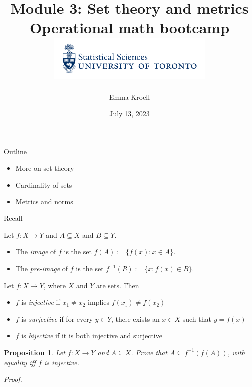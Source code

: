 \documentclass [aspectratio=169]{beamer}
\title[]{Module 3: Set theory and metrics \\ {\large Operational math bootcamp}\\ \includegraphics[width=8cm]{dept_logo.png}\vspace{-1em}}
\author[]{Emma Kroell}
\institute[]{University of Toronto}
\date{July 13,  2023}
\newtheorem{proposition}[theorem]{Proposition}
\begin{document}
{
\begin{frame}
    \titlepage
\end{frame}
}

\begin{frame}{Outline}
    \begin{itemize}
      \setlength\itemsep{1em}
    	\item More on set theory
	\item Cardinality of sets
	\item Metrics and norms
    \end{itemize}
\end{frame}

\begin{frame}{Recall}
\begin{definition}
Let $f:X \to Y$ and $A \subseteq X$ and $B \subseteq Y$. 
\begin{itemize}
\item The \emph{image} of $f$ is the set $f(A) := \{f(x): x \in A \}$.
\item The \emph{pre-image} of $f$ is the set $f^{-1}(B) := \{x: f(x) \in B \}$.
\end{itemize}
\end{definition}

\vspace{1em}


\begin{definition}
Let $f:X \to Y$, where $X$ and $Y$ are sets. Then
\begin{itemize}
    \item $f$ is \emph{injective} if $x_1 \neq x_2$ implies $f(x_1) \neq f(x_2)$
    \item $f$ is \emph{surjective} if for every $y \in Y$, there exists an $x \in X$ such that $y = f(x)$
    \item $f$ is \emph{bijective} if it is both injective and surjective
\end{itemize}
\end{definition}

\end{frame}

\begin{frame}
\begin{proposition}
Let $f: X \to Y$ and $A \subseteq X$. Prove that $A \subseteq f^{-1}(f(A))$, with equality iff $f$ is injective. 
\end{proposition}
\textit{Proof.}

\vspace{4.5cm}


\end{frame}
\end{document}
